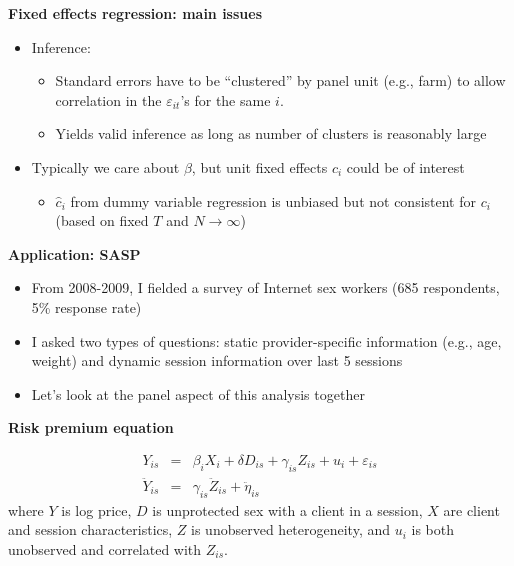 \documentclass{beamer}
\begin{document}
\begin{frame}[plain]
	\begin{center}
	\textbf{Fixed effects regression: main issues}
	\end{center}
	
	\begin{itemize}
	\item Inference:
		\begin{itemize}
		\item Standard errors have to be ``clustered'' by panel unit (e.g., farm) to allow correlation in the $\varepsilon_{it}$'s for the same $i$.
		\item Yields valid inference as long as number of clusters is reasonably large
		\end{itemize}	
	\item Typically we care about $\beta$, but unit fixed effects $c_i$ could be of interest
		\begin{itemize}
		\item $\widehat{c}_i$ from dummy variable regression is unbiased but not consistent for $c_i$ (based on fixed $T$ and $N\rightarrow \infty$)
		\end{itemize}
	\end{itemize}
\end{frame}


\begin{frame}
\begin{center}
\textbf{Application: SASP}
\end{center}

\begin{itemize}
\item From 2008-2009, I fielded a survey of Internet sex workers (685 respondents, 5\% response rate)
\item I asked two types of questions: static provider-specific information (e.g., age, weight) and dynamic session information over last 5 sessions
\item Let's look at the panel aspect of this analysis together
\end{itemize}

\end{frame}

\begin{frame}[plain]
\begin{center}
\textbf{Risk premium equation}
\end{center}

\begin{eqnarray*}
Y_{is} &=& \beta_i X_i + \delta{D_{is}} + \gamma_{is} Z_{is} + u_i + \varepsilon_{is} \\
\ddot{Y}_{is} &=& \gamma_{is} \ddot{Z}_{is} + \ddot \eta_{is}
\end{eqnarray*}where $Y$ is log price, $D$ is unprotected sex with a client in a session,  $X$ are client and session characteristics, $Z$ is unobserved heterogeneity, and $u_i$ is both unobserved and correlated with $Z_{is}$.  

\end{frame}
\end{document}

